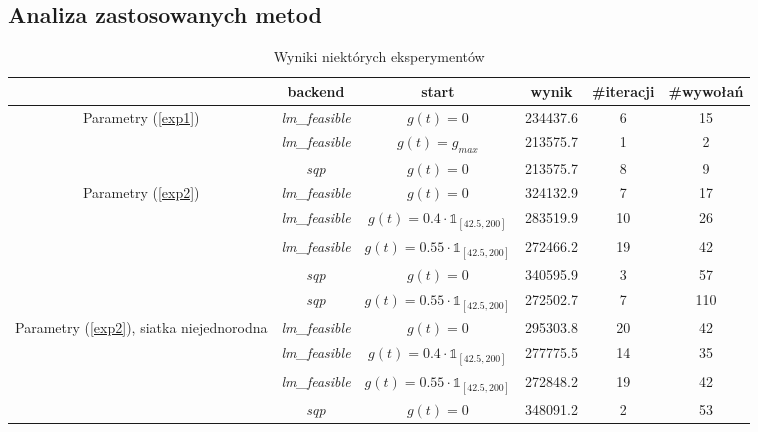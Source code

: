 \documentclass[11pt]{article}
\def\1{\mathds{1}}
\begin{document}
\subsection{Analiza zastosowanych metod}

\begin{table}[h]
  \begin{center}
    \begin{tabular}{|c|c|c|c|c|c|}
      \hline
      & backend & start & wynik & \#iteracji & \#wywołań \\
      \hline
      \multirow{3}{5em}{Parametry (\ref{exp1})} & {\it lm\_feasible\/} & $g(t) = 0$ & 234437.6 & 6 & 15 \\
      \cline{2-6}
      & {\it lm\_feasible\/} & $g(t) = g_{max}$ & 213575.7 & 1 & 2 \\
      \cline{2-6}
      & {\it sqp\/} & $g(t) = 0$ & 213575.7 & 8 & 9 \\
      \hline
      \multirow{5}{5em}{Parametry (\ref{exp2})} & {\it lm\_feasible\/} & $g(t) = 0$ & 324132.9 & 7 & 17 \\
      \cline{2-6}
      & {\it lm\_feasible\/} & $g(t) = 0.4\cdot\1_{[42.5,200]}$ & 283519.9 & 10 & 26 \\
      \cline{2-6}
      & {\it lm\_feasible\/} & $g(t) = 0.55\cdot\1_{[42.5,200]}$ & 272466.2 & 19 & 42 \\
      \cline{2-6}
      & {\it sqp\/} & $g(t) = 0$ & 340595.9 & 3 & 57 \\
      \cline{2-6}
      & {\it sqp\/} & $g(t) = 0.55\cdot\1_{[42.5,200]}$ & 272502.7 & 7 & 110 \\
      \hline
      \multirow{3}{6em}{Parametry (\ref{exp2}), siatka niejednorodna} & {\it lm\_feasible\/} & $g(t) = 0$ & 295303.8 & 20 & 42 \\
      \cline{2-6}
      & {\it lm\_feasible\/} & $g(t) = 0.4\cdot\1_{[42.5,200]}$ & 277775.5 & 14 & 35 \\
      \cline{2-6}
      & {\it lm\_feasible\/} & $g(t) = 0.55\cdot\1_{[42.5,200]}$ & 272848.2 & 19 & 42 \\
      \cline{2-6}
      & {\it sqp\/} & $g(t) = 0$ & 348091.2 & 2 & 53 \\
      \hline
    \end{tabular}
  \end{center}
  \caption{Wyniki niektórych eksperymentów}\label{resulttab}
\end{table}
\end{document}

